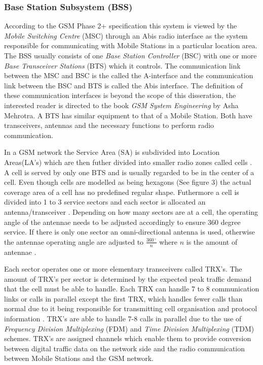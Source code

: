 \subsubsection{Base Station Subsystem (BSS)}

According to the GSM Phase 2+ specification this system is viewed by the \emph{Mobile Switching Centre} (MSC) through an Abis radio interface as the system responsible for communicating with Mobile Stations in a particular location area. The BSS usually consists of one \emph{Base Station Controller} (BSC) with one or more \emph{Base Transceiver Stations} (BTS) which it controls. The communication link between the MSC and BSC is the called the A-interface and the communication link between the BSC and BTS is called the Abis interface. The definition of these communication interfaces is beyond the scope of this disseration, the interested reader is directed to the book \emph{GSM System Engineering} by Asha Mehrotra. A BTS has similar equipment to that of a Mobile Station. Both have transceivers, antennas and the necessary functions to perform radio communication. 

In a GSM network the Service Area (SA) is subdivided into Location Areas(LA's) which are then futher divided into smaller radio zones called cells \cite{GSMSecurInTeleNetwork}. A cell is served by only one BTS and is usually regarded to be in the center of a cell. Even though cells are modelled as being hexagons (See figure 3) the actual coverage area of a cell has no predefined regular shape. Futhermore a cell is divided into 1 to 3 service sectors and each sector is allocated an antenna/transceiver \cite{GSMSysEngin}. Depending on how many sectors are at a cell, the operating angle of the antennae needs to be adjusted accordingly to ensure 360 degree service. If there is only one sector an omni-directional antenna is used, otherwise the antennae operating angle are adjusted to $\frac{360\,^{\circ}}{n}$ where ${n}$ is the amount of antennae \cite{Eisenblatter}.

Each sector operates one or more elementary transceivers called TRX’s. The amount of TRX’s per sector is determined by the expected peak traffic demand that the cell must be able to handle. Each TRX can handle 7 to 8 communication links or calls in parallel except the first TRX, which handles fewer calls than normal due to it being responsible for transmitting cell organisation and protocol information \cite{Eisenblatter}. TRX’s are able to handle 7-8 calls in parallel due to the use of \emph{Frequency Division Multiplexing} (FDM) and \emph{Time Division Multiplexing} (TDM) schemes. TRX’s are assigned channels which enable them to provide conversion between digital traffic data on the network side and the radio communication between Mobile Stations and 
the GSM network. \cite{ACOvsEA,FAPOrientationModel}

